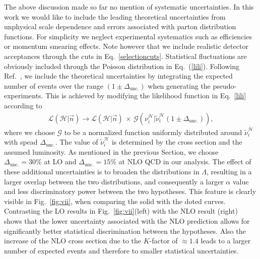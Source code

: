 \documentclass[preprint]{JHEP3} %
\newcommand{\be}{\begin{eqnarray}}
\newcommand{\ee}{\end{eqnarray}}
\begin{document}
The above discussion made so far no mention of systematic uncertainties.
In this work we would like to include the leading theoretical uncertainties from unphysical scale dependence and errors associated with parton distribution functions.
For simplicity we neglect experimental systematics such as efficiencies or momentum smearing effects.
Note however that we include realistic detector acceptances through the cuts in Eq.~\ref{selectioncuts}.
Statistical fluctuations are obviously included through the Poisson distribution in Eq.~(\ref{lili}).
Following Ref.~\cite{Conway}, we include the theoretical uncertainties 
by integrating the expected number of events over the range $(1 \pm \Delta_\mathrm{unc.})$ 
when generating the pseudo-experiments.
This is achieved by modifying the likelihood function in Eq.~\ref{lili} according to
\be
  \mathcal{L}(\mathcal{H}|\vec{n}) \to \mathcal{L}(\mathcal{H}|\vec{n})  \,\times\, \mathcal{G} \left( \nu_i^\mathcal{H} | \tilde{\nu}_i^\mathcal{H}  (1 \pm \Delta_\mathrm{unc.}) \right),
\ee
where we choose $\mathcal{G}$ to be a normalized function uniformly distributed around $\tilde{\nu}_i^\mathcal{H}$ with spead $\Delta_\mathrm{unc.}$.
The value of $\tilde{\nu}_i^\mathcal{H}$ is determined by the cross section and the assumed luminosity.
As mentioned in the previous Section, we choose $\Delta_\mathrm{unc.} = 30\%$ at LO
and $\Delta_\mathrm{unc.} = 15\%$ at NLO QCD in our analysis.
The effect of these additional uncertainties is to broaden the distributions in $\Lambda$, 
resulting in a larger overlap between the two distributions, and consequently a larger $\alpha$ value and less discriminatory power between the two hypotheses. 
This feature is clearly visible in Fig.~\ref{fig:vii}, when comparing the solid with the doted curves. 
Contrasting the LO results in Fig.~\ref{fig:vii}(left) with the NLO result (right) shows that 
the lower uncertainty associated with the NLO prediction allows for significantly better statistical discrimination between the hypotheses.
Also the increase of the NLO cross section due to the $K$-factor of $\approx1.4$ leads to a larger number of expected events and therefore to smaller statistical uncertainties.
\end{document}
